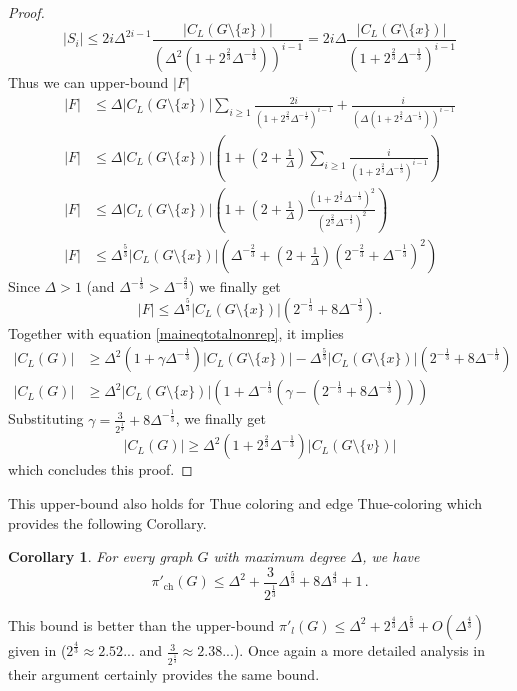 \documentclass[a4paper,10pt]{article}
\newtheorem{corollary}[theorem]{Corollary}
\begin{document}
\begin{proof}
$$|S_i|\le 2i\Delta^{2i-1} \frac{|C_L(G\setminus \{x\})|}{(\Delta^2(1+2^{\frac{2}{3}}\Delta^{-\frac{1}{3}}))^{i-1}}= 2i\Delta \frac{|C_L(G\setminus \{x\})|}{(1+2^{\frac{2}{3}}\Delta^{-\frac{1}{3}})^{i-1}}$$
Thus we can upper-bound $|F|$
\begin{align*}
 |F|&\le\Delta |C_L(G\setminus \{x\})|\sum_{i\ge1}  \frac{2i}{(1+2^{\frac{2}{3}}\Delta^{-\frac{1}{3}})^{i-1}}
 + \frac{i}{(\Delta(1+2^{\frac{2}{3}}\Delta^{-\frac{1}{3}}))^{i-1}}\\
 |F|&\le\Delta |C_L(G\setminus \{x\})|\left(1+\left(2+\frac{1}{\Delta}\right)\sum_{i\ge1}  \frac{i}{(1+2^{\frac{2}{3}}\Delta^{-\frac{1}{3}})^{i-1}}\right)\\
 |F|&\le\Delta |C_L(G\setminus \{x\})|\left(1+\left(2+\frac{1}{\Delta}\right)\frac{(1+2^{\frac{2}{3}}\Delta^{-\frac{1}{3}})^2}{(2^{\frac{2}{3}}\Delta^{-\frac{1}{3}})^2}\right)\\
 |F|&\le\Delta^{\frac{5}{3}} |C_L(G\setminus \{x\})| \left(\Delta^{-\frac{2}{3}}+\left(2+\frac{1}{\Delta}\right)
\left(2^{-\frac{2}{3}}+\Delta^{-\frac{1}{3}}\right)^2\right)
 \end{align*}
 Since $\Delta>1$ (and $\Delta ^{-\frac{1}{3}}> \Delta ^{-\frac{2}{3}}$) we finally get
$$
 |F|\le\Delta^{\frac{5}{3}} |C_L(G\setminus \{x\})| \left(
 2^{-\frac{1}{3}}+8\Delta^{-\frac{1}{3}}
 \right)\,.$$
Together with equation \eqref{maineqtotalnonrep}, it implies
\begin{align*}
|C_L(G)|&\ge \Delta^2(1+\gamma \Delta^{-\frac{1}{3}})|C_L(G\setminus\{x\})|-\Delta^{\frac{5}{3}} |C_L(G\setminus \{x\})| \left(
 2^{-\frac{1}{3}}+8\Delta^{-\frac{1}{3}}
 \right)\\
|C_L(G)|&\ge \Delta^2|C_L(G\setminus\{x\})|\left(1+\Delta^{-\frac{1}{3}}\left(\gamma-\left(
 2^{-\frac{1}{3}}+8\Delta^{-\frac{1}{3}}
 \right)\right)\right)
\end{align*}
Substituting $\gamma =\frac{3}{2^{\frac{1}{3}}}+8\Delta^{-\frac{1}{3}}$, we finally get
$$|C_L(G)|\ge  \Delta^2\left(1+2^{\frac{2}{3}}\Delta^{-\frac{1}{3}}\right)|C_L(G\setminus\{v\})|$$
which concludes this proof.
\end{proof}
This upper-bound also holds for Thue coloring and edge Thue-coloring which provides the following Corollary.
\begin{corollary}
 For every graph $G$ with maximum degree $\Delta$, we have
 $$\pi'_{\operatorname{ch}}(G)\le
 \Delta^2+\frac{3}{2^\frac{1}{3}}\Delta^{\frac{5}{3}}+8\Delta^{\frac{4}{3}}+1\,.$$ 
\end{corollary}
This bound is better than the upper-bound
$\pi'_l(G)\le \Delta^2+2^{\frac{4}{3}}\Delta^{\frac{5}{3}}+O(\Delta^{\frac{4}{3}})$ given in 
\cite{MontassierEntropie} ($2^{\frac{4}{3}}\approx2.52...$ and $\frac{3}{2^\frac{1}{3}}\approx2.38...$).
Once again a more detailed analysis in their argument certainly provides the same bound.
\end{document}
